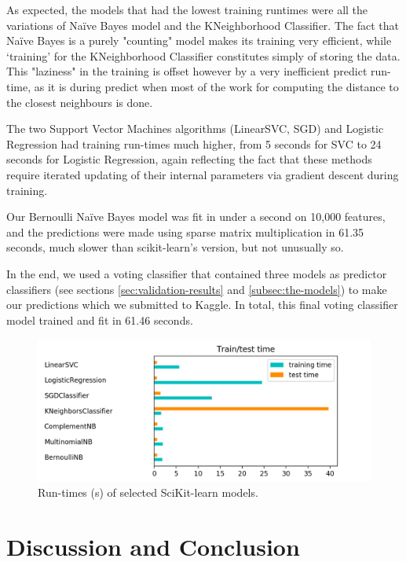 \documentclass[letterpaper, 11pt]{article}
\begin{document}
As expected, the models that had the lowest training runtimes were all the variations of Na\"ive Bayes model and the KNeighborhood Classifier. The fact that Na\"ive Bayes is a purely "counting" model makes its training very efficient, while `training' for the KNeighborhood Classifier constitutes simply of storing the data. This "laziness" in the training is offset however by a very inefficient predict run-time, as it is during predict when most of the work for computing the distance to the closest neighbours is done.\cite{Hamilton:2019} 

The two Support Vector Machines algorithms (LinearSVC, SGD) and Logistic Regression had training run-times much higher, from 5 seconds for SVC to 24 seconds for Logistic Regression, again reflecting the fact that these methods require iterated updating of their internal parameters via gradient descent during training.

Our Bernoulli Na\"ive Bayes model was fit in under a second on 10,000 features, and the predictions were made using sparse matrix multiplication in 61.35 seconds, much slower than scikit-learn's version, but not unusually so.

In the end, we used a voting classifier that contained three models as predictor classifiers (see sections \ref{sec:validation-results} and \ref{subsec:the-models}) to make our predictions which we submitted to Kaggle. In total, this final voting classifier model trained and fit in 61.46 seconds.  

\begin{figure}
    \centering
    \includegraphics[width=\textwidth/2]{images/timing.png}
    \caption{Run-times (s) of selected SciKit-learn models.}
    \label{fig:runtimes}
\end{figure}

\section{Discussion and Conclusion}
\end{document}
